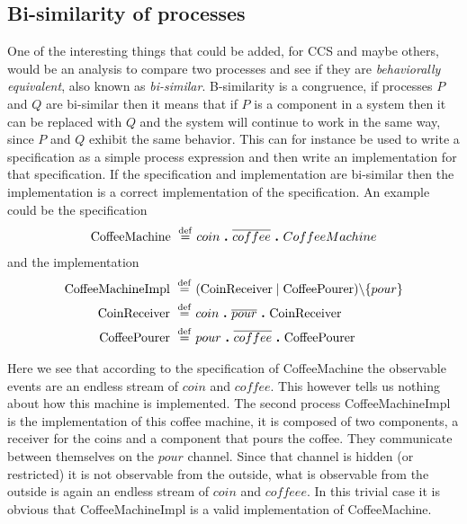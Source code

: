	\subsection{Bi-similarity of processes}
	One of the interesting things that could be added, for CCS and maybe others, 
	would be an analysis to compare two processes and see if they are 
	\textit{behaviorally equivalent}, also known as \textit{bi-similar}. 
	B-similarity is a congruence, if processes $P$ and $Q$ are bi-similar then 
	it means that if $P$ is a component in a system then it can be replaced with 
	$Q$ and the system will continue to work in the same way, since $P$ and $Q$ 
	exhibit the same behavior. This can for instance be used to write a 
	specification as a simple process expression and then write an 
	implementation for that specification. If the specification and 
	implementation are bi-similar then the implementation is a correct 
	implementation of the specification. An example could be the specification
  \begin{align*}
			\mathrm{CoffeeMachine} \ \stackrel{\mathrm{def}}{=}\  & coin  \ \textbf{.}\  \overline{coffee} \ \textbf{.}\  CoffeeMachine \\
	\end{align*} and the implementation
  \begin{align*}
			\mathrm{CoffeeMachineImpl} \ \stackrel{\mathrm{def}}{=}\  & ( \mathrm{CoinReceiver} \mid \mathrm{CoffeePourer} ) \backslash \{pour\} \\
			\mathrm{CoinReceiver} \ \stackrel{\mathrm{def}}{=}\  & coin \ \textbf{.}\  \overline{pour} \ \textbf{.}\  \mathrm{CoinReceiver} \\
			\mathrm{CoffeePourer} \ \stackrel{\mathrm{def}}{=}\  & pour \ \textbf{.}\  \overline{coffee} \ \textbf{.}\  \mathrm{CoffeePourer}
	\end{align*}	

	Here we see that according to the specification of \textsf{CoffeeMachine} 
	the observable events are an endless stream of $coin$ and $coffee$. This 
	however tells us nothing about how this machine is implemented. The second 
	process \textsf{CoffeeMachineImpl} is the implementation of this coffee 
	machine, it is composed of two components, a receiver for the coins and a 
	component that pours the coffee. They communicate between themselves on the 
	$pour$ channel. Since that channel is hidden (or restricted) it is not 
	observable from the outside, what is observable from the outside is again an 
	endless stream of $coin$ and $coffeee$. In this trivial case it is obvious 
	that \textsf{CoffeeMachineImpl} is a valid implementation of 
	\textsf{CoffeeMachine}.
	
